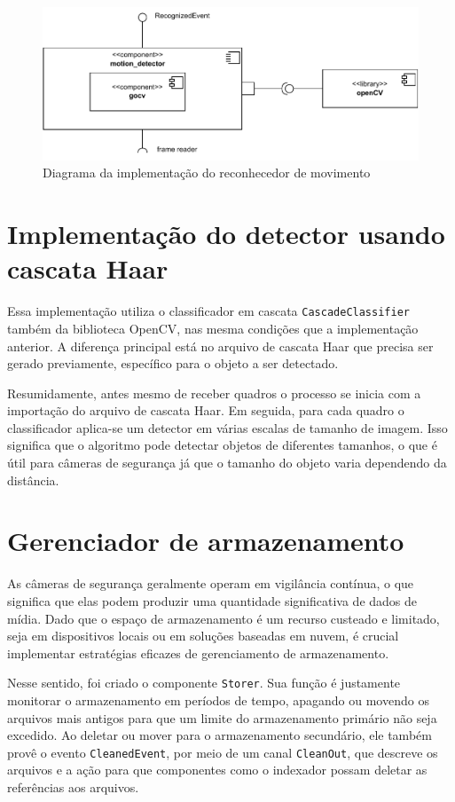 \documentclass[12pt, %
openright, 
oneside, %
a4paper,    %
brazil]{facom-ufu-abntex2}
\begin{document}
\clearpage

\begin{figure}[!ht]
	\centering
	\includegraphics[width=1.0\linewidth]{motion_detector.pdf}
	\caption[Diagrama da implementação do reconhecedor de movimento]{Diagrama da implementação do reconhecedor de movimento}
	\label{fig:graficosVariandoTamanhoRede}
\end{figure}

\section{Implementação do detector usando cascata Haar}
Essa implementação utiliza o classificador em cascata
\texttt{CascadeClassifier} também da biblioteca OpenCV, nas mesma condições que
a implementação anterior. A diferença principal está no arquivo de cascata Haar
que precisa ser gerado previamente, específico para o objeto a ser detectado.

Resumidamente, antes mesmo de receber quadros o processo se inicia com a
importação do arquivo de cascata Haar. Em seguida, para cada quadro o
classificador aplica-se um detector em várias escalas de tamanho de imagem.
Isso significa que o algoritmo pode detectar objetos de diferentes tamanhos, o
que é útil para câmeras de segurança já que o tamanho do objeto varia
dependendo da distância.

\section{Gerenciador de armazenamento}
As câmeras de segurança geralmente operam em vigilância contínua, o que
significa que elas podem produzir uma quantidade significativa de dados de
mídia. Dado que o espaço de armazenamento é um recurso custeado e limitado,
seja em dispositivos locais ou em soluções baseadas em nuvem, é crucial
implementar estratégias eficazes de gerenciamento de armazenamento.

Nesse sentido, foi criado o componente \texttt{Storer}. Sua função é justamente
monitorar o armazenamento em períodos de tempo, apagando ou movendo os arquivos
mais antigos para que um limite do armazenamento primário não seja excedido. Ao
deletar ou mover para o armazenamento secundário, ele também provê o evento
\texttt{CleanedEvent}, por meio de um canal \texttt{CleanOut}, que descreve os
arquivos e a ação para que componentes como o indexador possam deletar as
referências aos arquivos.
\end{document}
